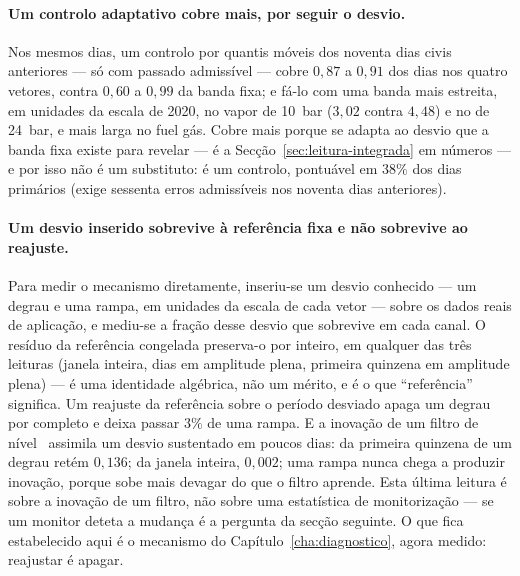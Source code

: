 \paragraph{Um controlo adaptativo cobre mais, por seguir o desvio.} Nos
mesmos dias, um controlo por quantis móveis dos noventa dias civis
anteriores --- só com passado admissível --- cobre $0{,}87$ a $0{,}91$ dos
dias nos quatro vetores, contra $0{,}60$ a $0{,}99$ da banda fixa; e fá-lo
com uma banda mais estreita, em unidades da escala de 2020, no vapor de
10~bar ($3{,}02$ contra $4{,}48$) e no de 24~bar, e mais larga no fuel gás.
Cobre mais porque se adapta ao desvio que a banda fixa existe para revelar
--- é a Secção~\ref{sec:leitura-integrada} em números --- e por isso não é
um substituto: é um controlo, pontuável em $38\%$ dos dias primários
(exige sessenta erros admissíveis nos noventa dias anteriores).

\paragraph{Um desvio inserido sobrevive à referência fixa e não sobrevive ao
reajuste.} Para medir o mecanismo diretamente, inseriu-se um desvio
conhecido --- um degrau e uma rampa, em unidades da escala de cada vetor
--- sobre os dados reais de aplicação, e mediu-se a fração desse desvio que
sobrevive em cada canal. O resíduo da referência congelada preserva-o por
inteiro, em qualquer das três leituras (janela inteira, dias em amplitude
plena, primeira quinzena em amplitude plena) --- é uma identidade algébrica,
não um mérito, e é o que ``referência'' significa. Um reajuste da referência
sobre o período desviado apaga um degrau por completo e deixa passar $3\%$
de uma rampa. E a inovação de um filtro de nível~\cite{DurbinKoopman2012} assimila um
desvio sustentado em poucos dias: da primeira quinzena de um degrau retém
$0{,}136$; da janela inteira, $0{,}002$; uma rampa nunca chega a produzir
inovação, porque sobe mais devagar do que o filtro aprende. Esta última
leitura é sobre a inovação de um filtro, não sobre uma estatística de
monitorização --- se um monitor deteta a mudança é a pergunta da secção
seguinte. O que fica estabelecido aqui é o mecanismo do
Capítulo~\ref{cha:diagnostico}, agora medido: reajustar é apagar.

